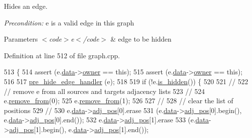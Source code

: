 Hides an edge.

{\itshape Precondition\+:} {\ttfamily e} is a valid edge in this graph


\begin{DoxyParams}{Parameters}
{\em $<$code$>$e$<$/code$>$} & edge to be hidden \\
\hline
\end{DoxyParams}


Definition at line 512 of file graph.\+cpp.


\begin{DoxyCode}
513 \{
514     assert (e.\mbox{\hyperlink{classedge_a0ebb6dfa28b77f47529085049352b436}{data}}->\mbox{\hyperlink{classedge__data_a00436f2956a69cd9dc8e5bfa530e0ce9}{owner}} == \textcolor{keyword}{this});
515     assert (e.\mbox{\hyperlink{classedge_a0ebb6dfa28b77f47529085049352b436}{data}}->\mbox{\hyperlink{classedge__data_a00436f2956a69cd9dc8e5bfa530e0ce9}{owner}} == \textcolor{keyword}{this});
516 
517     \mbox{\hyperlink{classgraph_aa33201befa6ad7433becd7424d6de55b}{pre\_hide\_edge\_handler}} (e);
518     
519     \textcolor{keywordflow}{if} (!e.\mbox{\hyperlink{classedge_ab6d6192a90b1cb77ce9dee2de78d9743}{is\_hidden}}()) \{
520 
521     \textcolor{comment}{//}
522     \textcolor{comment}{// remove e from all sources and targets adjacency lists}
523     \textcolor{comment}{//}
524     e.\mbox{\hyperlink{classedge_abcd4eeaf23327d026beac9ee1d0fa7e9}{remove\_from}}(0);
525     e.\mbox{\hyperlink{classedge_abcd4eeaf23327d026beac9ee1d0fa7e9}{remove\_from}}(1);
526     
527     \textcolor{comment}{//}
528     \textcolor{comment}{// clear the list of positions}
529     \textcolor{comment}{//}
530     e.\mbox{\hyperlink{classedge_a0ebb6dfa28b77f47529085049352b436}{data}}->\mbox{\hyperlink{classedge__data_aa325caa449576727df8042bad875bf43}{adj\_pos}}[0].erase 
531         (e.\mbox{\hyperlink{classedge_a0ebb6dfa28b77f47529085049352b436}{data}}->\mbox{\hyperlink{classedge__data_aa325caa449576727df8042bad875bf43}{adj\_pos}}[0].begin(), e.\mbox{\hyperlink{classedge_a0ebb6dfa28b77f47529085049352b436}{data}}->\mbox{\hyperlink{classedge__data_aa325caa449576727df8042bad875bf43}{adj\_pos}}[0].end()); 
532     e.\mbox{\hyperlink{classedge_a0ebb6dfa28b77f47529085049352b436}{data}}->\mbox{\hyperlink{classedge__data_aa325caa449576727df8042bad875bf43}{adj\_pos}}[1].erase 
533         (e.\mbox{\hyperlink{classedge_a0ebb6dfa28b77f47529085049352b436}{data}}->\mbox{\hyperlink{classedge__data_aa325caa449576727df8042bad875bf43}{adj\_pos}}[1].begin(), e.\mbox{\hyperlink{classedge_a0ebb6dfa28b77f47529085049352b436}{data}}->\mbox{\hyperlink{classedge__data_aa325caa449576727df8042bad875bf43}{adj\_pos}}[1].end());

\end{DoxyCode}
